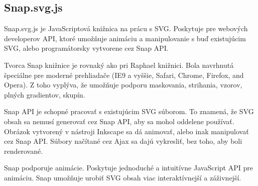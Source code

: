 \subsection{Snap.svg.js}

Snap.svg.js je JavaScriptová knižnica na prácu s SVG. Poskytuje pre webových developerov \acs{API}, ktoré umožňuje animáciu a manipulovanie s buď existujúcim SVG, alebo programátorsky vytvorene cez Snap API. 

%

Tvorca Snap knižnice je rovnaký ako pri Raphael knižnici.  Bola navrhnutá špeciálne pre moderné prehliadače (IE9 a vyššie, Safari, Chrome, Firefox, and Opera). Z toho vyplýva, že umožňuje podporu maskovania, strihania, vzorov, plných gradientov, skupín. 

Snap API je schopné pracovať s existujúcim SVG súborom. To znamená, že SVG obsah sa nemusí  generovať cez Snap API, aby sa mohol oddelene používať. Obrázok vytvorený v nástroji  Inkscape sa dá animovať, alebo inak manipulovať cez Snap API.
Súbory načítané cez Ajax sa dajú vykresliť, bez toho, aby boli renderované. 


Snap podporuje animácie. Poskytuje jednoduché a intuitívne JavaScript API pre animáciu. Snap umožňuje urobiť SVG obsah viac interaktívnejší a záživnejší. \cite{snapsvg}




